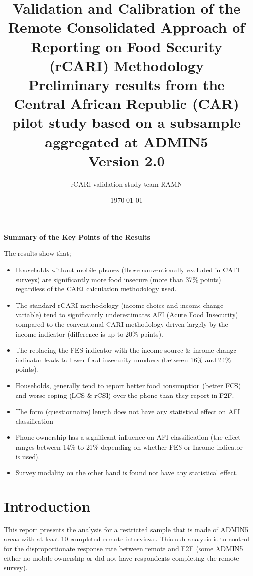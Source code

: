\documentclass[11pt,harvard]{article}
\author{rCARI validation study team-RAMN}
\date{\today}
\title{Validation and Calibration of the Remote Consolidated Approach of Reporting on Food Security (rCARI) Methodology 
	\\ {\normalsize Preliminary results from the Central African Republic (CAR) pilot study based on a subsample aggregated at ADMIN5} 
	\\{\normalsize{Version 2.0}} }
\begin{document}
	\maketitle \vspace{-1cm}
	\onehalfspacing
	\pagebreak
	\setlength{\parskip}{6pt} %
	\tableofcontents
	\pagebreak
	
	
\textbf{Summary of the Key Points of the Results}

The results show that; 
\begin{itemize}
	\item Households without mobile phones (those conventionally excluded in CATI surveys) are significantly more food insecure (more than 37\% points) regardless of the CARI calculation methodology used. 
	\item The standard rCARI methodology (income choice and income change variable) tend to significantly underestimates AFI (Acute Food Insecurity) compared to the conventional CARI methodology-driven largely by the income indicator (difference is up to 20\% points).
	\item The replacing the FES indicator with the income source \& income change indicator leads to lower food insecurity numbers (between 16\% and 24\% points).
	\item Households, generally tend to report better food consumption (better FCS) and worse coping (LCS \& rCSI) over the phone than they report in F2F.
	\item The form (questionnaire) length does not have any statistical effect on AFI classification.
	\item Phone ownership has a significant influence on AFI classification (the effect ranges between 14\% to 21\% depending on whether FES or Income indicator is used). 
	\item Survey modality on the other hand is found not have any statistical effect.
\end{itemize}

\pagebreak

\section{Introduction}

This report presents the analysis for a restricted sample that is made of ADMIN5 areas with at least 10 completed remote interviews. This sub-analysis is to control for the disproportionate response rate between remote and F2F (some ADMIN5 either no mobile ownership or did not have respondents completing the remote survey).
\end{document}
